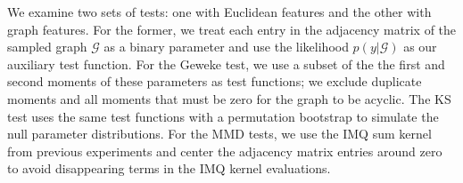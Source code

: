 \documentclass{article}
\begin{document}
We examine two sets of tests: one with Euclidean features and the other with graph features. 
For the former, we treat each entry in the adjacency matrix of the sampled graph $\mathcal{G}$ as a binary parameter and use the likelihood $p(y|\mathcal{G})$ as our auxiliary test function. 
For the Geweke test, we use a subset of the the first and second moments of these parameters as test functions; we exclude duplicate moments and all moments that must be zero for the graph to be acyclic. 
The KS test uses the same test functions with a permutation bootstrap to simulate the null parameter distributions.
For the MMD tests, we use the IMQ sum kernel from previous experiments and center the adjacency matrix entries around zero to avoid disappearing terms in the IMQ kernel evaluations. 
\end{document}
